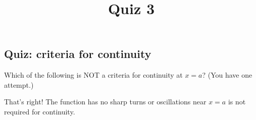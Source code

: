 \documentclass{ximera}
\title{Quiz 3}
\begin{document}
\begin{abstract}
\end{abstract}

\maketitle

\subsection{Quiz: criteria for continuity}

\begin{question}
Which of the following is NOT a criteria for continuity at $x=a$? (You have one attempt.)
\begin{multipleChoice}  
\end{multipleChoice} 

\begin{explanation}
     That's right! The function has no sharp turns or oscillations near $x=a$ is not required for continuity.
 \end{explanation} 
\end{question}
\end{document}
